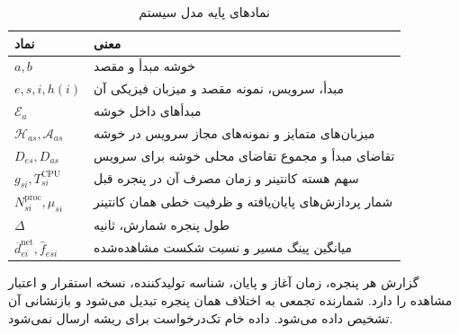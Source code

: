 \begin{longtable}{>{\centering\arraybackslash}p{3.3cm}p{9.8cm}}
\caption{نمادهای پایه مدل سیستم}
\label{tab:system-symbols}\\
\toprule نماد & معنی \\ \midrule
$a,b$ & خوشه مبدأ و مقصد \\
$e,s,i,h(i)$ & مبدأ، سرویس، نمونه مقصد و میزبان فیزیکی آن \\
$\mathcal E_a$ & مبدأهای داخل خوشه \\
$\mathcal H_{as},\mathcal A_{as}$ & میزبان‌های متمایز و نمونه‌های مجاز سرویس در خوشه \\
$D_{es},D_{as}$ & تقاضای مبدأ و مجموع تقاضای محلی خوشه برای سرویس \\
$g_{si},T^{\mathrm{CPU}}_{si}$ & سهم هسته کانتینر و زمان مصرف آن در پنجره قبل \\
$N^{\mathrm{proc}}_{si},\mu_{si}$ & شمار پردازش‌های پایان‌یافته و ظرفیت خطی همان کانتینر \\
$\Delta$ & طول پنجره شمارش، ثانیه \\
$\overline d^{\mathrm{net}}_{ei},\widehat f_{esi}$ & میانگین پینگ مسیر و نسبت شکست مشاهده‌شده \\
\bottomrule
\end{longtable}

گزارش هر پنجره، زمان آغاز و پایان، شناسه تولیدکننده، نسخه استقرار و اعتبار مشاهده را دارد. شمارنده تجمعی به اختلاف همان پنجره تبدیل می‌شود و بازنشانی آن تشخیص داده می‌شود. داده خام تک‌درخواست برای ریشه ارسال نمی‌شود.

